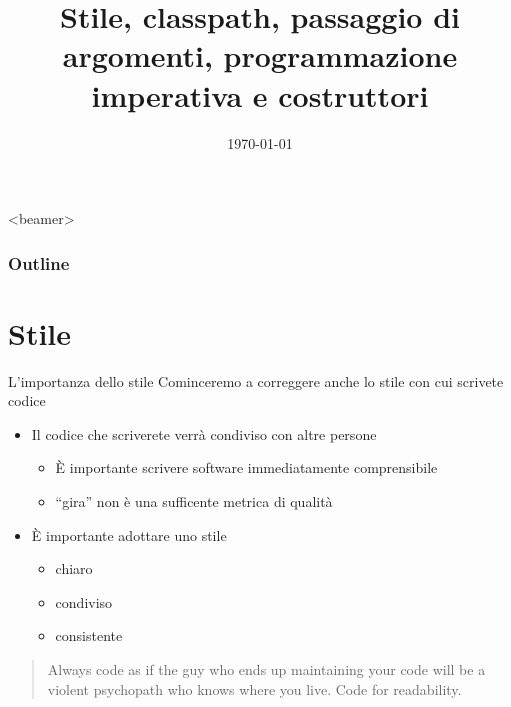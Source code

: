\documentclass[presentation]{beamer}
\title[{\lab} -- Strumenti Avanzati]{Stile, classpath, passaggio di argomenti, programmazione imperativa e costruttori}
\date[\today]{\today}
\begin{document}
\frame[label=coverpage]{\titlepage}

\begin{frame}<beamer>
	\frametitle{Outline}
	\tableofcontents[]
\end{frame}


\section{Stile}

\begin{frame}{L'importanza dello stile}
	Cominceremo a correggere anche lo stile con cui scrivete codice
	\begin{itemize}
		\item Il codice che scriverete verrà condiviso con altre persone
		\begin{itemize}
			\item È importante scrivere software immediatamente comprensibile
			\item ``gira'' non è una sufficente metrica di qualità
		\end{itemize}
		\item È importante adottare uno stile
		\begin{itemize}
			\item chiaro
			\item condiviso
			\item consistente
		\end{itemize}
	\end{itemize}
	\vspace{1cm}
	\begin{quote}
		Always code as if the guy who ends up maintaining your code will be a violent psychopath who knows where you live. Code for readability.
	\end{quote}
\end{frame}
\end{document}
